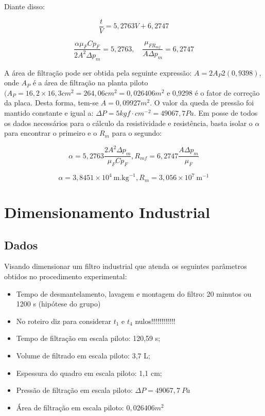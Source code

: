 Diante disso:

\begin{equation}\label{key}
\frac{t}{V}=5,2763 V+6,2747
\end{equation}

\begin{equation}\label{key}
\frac{\alpha \mu_{F} C p_{F}}{2 A^{2} \Delta p_{m}}=5,2763, \quad \frac{\mu_{F R_{m f}}}{A \Delta p_{m}}=6,2747
\end{equation}

A área de filtração pode ser obtida pela seguinte expressão: $A=2A_{P}2(0,9398)$, onde $A_{P}$ é a área de filtração na planta piloto $(A_{P}=16,2 \times16,3 cm^{2}=264,06 cm^{2} = 0,026406 m^{2}$ e 0,9298 é o fator de correção da placa. Desta forma, tem-se $A = 0,09927 m^{2}$.
O valor da queda de pressão foi mantido constante e igual a: $\Delta P= 5 kgf\cdot cm^{-2} = 49067,7 Pa$.
Em posse de todos os dados necessários para o cálculo da resistividade e resistência, basta isolar o $\alpha$ para encontrar o primeiro e o $R_{m}$ para o segundo:

\begin{equation}\label{key}
\alpha=5,2763 \frac{2 A^{2} \Delta p_{m}}{\mu_{F} C p_{F}}, R_{m f}=6,2747 \frac{A \Delta p_{m}}{\mu_{F}}
\end{equation}

\begin{equation}\label{key}
\alpha=3,8451 \times 10^{4} \ \mathrm{m} . \mathrm{kg}^{-1}, R_{m}=3,056 \times 10^{7} \ \mathrm{m}^{-1}
\end{equation}

\chapter{Dimensionamento Industrial}


\section{Dados}
Visando dimensionar um filtro industrial que atenda os seguintes parâmetros obtidos no procedimento experimental:



\begin{itemize}
\item Tempo de desmantelamento, lavagem e montagem do filtro: 20 minutos ou 1200 s (hipótese do grupo)
\item No roteiro diz para considerar $ t_{1} $ e $ t_{4} $ nulos!!!!!!!!!!!!
\item Tempo de filtração em escala piloto: 120,59 s;
\item Volume de filtrado em escala piloto: 3,7 L;
\item Espessura do quadro em escala piloto: 1,1 cm;
\item Pressão de filtração em escala piloto: $\Delta P= 49067,7 \ Pa$
\item Área de filtração em escala piloto: $ 0,026406 m^{2} $
\end{itemize}




